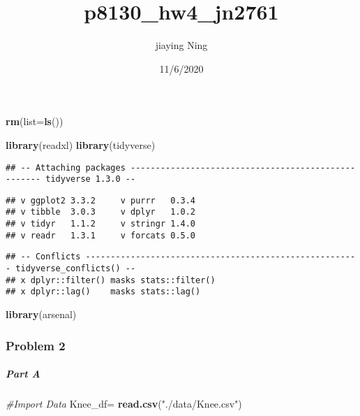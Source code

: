 \documentclass[]{article}
\title{p8130\_hw4\_jn2761}
\author{jiaying Ning}
\date{11/6/2020}
\newenvironment{Shaded}{\begin{snugshade}}{\end{snugshade}}
\newcommand{\CommentTok}[1]{\textcolor[rgb]{0.56,0.35,0.01}{\textit{#1}}}
\newcommand{\DataTypeTok}[1]{\textcolor[rgb]{0.13,0.29,0.53}{#1}}
\newcommand{\KeywordTok}[1]{\textcolor[rgb]{0.13,0.29,0.53}{\textbf{#1}}}
\newcommand{\NormalTok}[1]{#1}
\newcommand{\StringTok}[1]{\textcolor[rgb]{0.31,0.60,0.02}{#1}}
\let\oldsubparagraph\subparagraph
\renewcommand{\subparagraph}[1]{\oldsubparagraph{#1}\mbox{}}
\begin{document}
\maketitle

\begin{Shaded}
\begin{Highlighting}[]
\KeywordTok{rm}\NormalTok{(}\DataTypeTok{list=}\KeywordTok{ls}\NormalTok{())}
\end{Highlighting}
\end{Shaded}

\begin{Shaded}
\begin{Highlighting}[]
\KeywordTok{library}\NormalTok{(readxl)}
\KeywordTok{library}\NormalTok{(tidyverse)}
\end{Highlighting}
\end{Shaded}

\begin{verbatim}
## -- Attaching packages ---------------------------------------------------- tidyverse 1.3.0 --
\end{verbatim}

\begin{verbatim}
## v ggplot2 3.3.2     v purrr   0.3.4
## v tibble  3.0.3     v dplyr   1.0.2
## v tidyr   1.1.2     v stringr 1.4.0
## v readr   1.3.1     v forcats 0.5.0
\end{verbatim}

\begin{verbatim}
## -- Conflicts ------------------------------------------------------- tidyverse_conflicts() --
## x dplyr::filter() masks stats::filter()
## x dplyr::lag()    masks stats::lag()
\end{verbatim}

\begin{Shaded}
\begin{Highlighting}[]
\KeywordTok{library}\NormalTok{(arsenal)}
\end{Highlighting}
\end{Shaded}

\hypertarget{problem-2}{%
\subsubsection{Problem 2}\label{problem-2}}

\hypertarget{part-a}{%
\subparagraph{Part A}\label{part-a}}

\begin{Shaded}
\begin{Highlighting}[]
\CommentTok{#Import Data }
\NormalTok{Knee_df=}
\StringTok{   }\KeywordTok{read.csv}\NormalTok{(}\StringTok{"./data/Knee.csv"}\NormalTok{)}
\end{Highlighting}
\end{Shaded}
\end{document}
